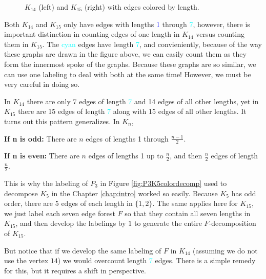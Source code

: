 \begin{figure}[H]
\begin{center}
\begin{tikzpicture}[scale=2]
            
    \end{tikzpicture}
    \end{center}
\caption{$K_{14}$ (left) and $K_{15}$ (right) with edges colored by length.}
\label{fig:K14K15colored}
\end{figure}

Both $K_{14}$ and $K_{15}$ only have edges with lengths \textcolor{blue}{1} through \textcolor{cyan}{7}, however, there is important distinction in counting edges of one length in $K_{14}$ versus counting them in $K_{15}$. The \textcolor{cyan}{cyan} edges have length \textcolor{cyan}{7}, and convieniently, because of the way these graphs are drawn in the figure above, we can easily count them as they form the innermost spoke of the graphs. Because these graphs are so similar, we can use one labeling to deal with both at the same time! However, we must be very careful in doing so.

In $K_{14}$ there are only 7 edges of length \textcolor{cyan}{7} and 14 edges of all other lengths, yet in $K_{15}$ there are 15 edges of length \textcolor{cyan}{7} along with 15 edges of all other lengths. It turns out this pattern generalizes. In $K_{n}$,

\textbf{If n is odd:} There are $n$ edges of lengths 1 through $\frac{n-1}{2}$.

\textbf{If n is even:} There are $n$ edges of lengths 1 up to $\frac{n}{2}$, and then $\frac{n}{2}$ edges of length $\frac{n}{2}.$

\noindent This is why the labeling of $P_{3}$ in Figure \ref{fig:P3K5colordecomp} used to decompose $K_{5}$ in the Chapter \ref{chap:intro} worked so easily. Because $K_{5}$ has odd order, there are $5$ edges of each length in $\{1,2\}$. The same applies here for $K_{15}$, we just label each seven edge forest $F$ so that they contain all seven lengths in $K_{15}$, and then develop the labelings by $1$ to generate the entire $F$-decomposition of $K_{15}$. 

But notice that if we develop the same labeling of $F$ in $K_{14}$ (assuming we do not use the vertex $14$) we would overcount length \textcolor{cyan}{7} edges. There is a simple remedy for this, but it requires a shift in perspective.

